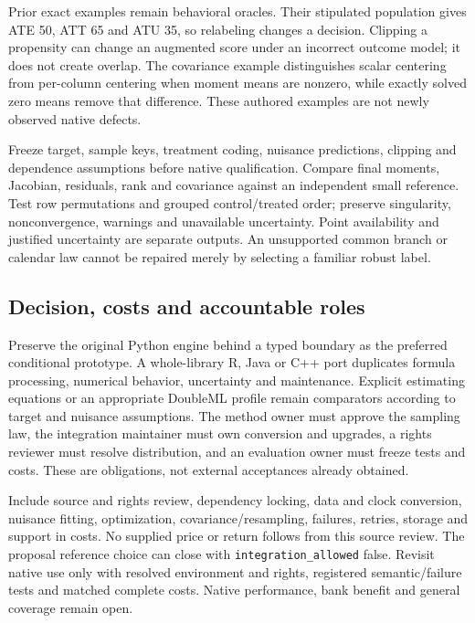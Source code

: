 Prior exact examples remain behavioral oracles. Their stipulated population gives ATE 50, ATT 65 and ATU 35, so relabeling changes a decision. Clipping a propensity can change an augmented score under an incorrect outcome model; it does not create overlap. The covariance example distinguishes scalar centering from per-column centering when moment means are nonzero, while exactly solved zero means remove that difference. These authored examples are not newly observed native defects.~\citep{exec20_python_effect_reference}

Freeze target, sample keys, treatment coding, nuisance predictions, clipping and dependence assumptions before native qualification. Compare final moments, Jacobian, residuals, rank and covariance against an independent small reference. Test row permutations and grouped control/treated order; preserve singularity, nonconvergence, warnings and unavailable uncertainty. Point availability and justified uncertainty are separate outputs. An unsupported common branch or calendar law cannot be repaired merely by selecting a familiar robust label.~\citep{exec20_python_effect_source,exec20_python_effect_reference}

\subsection{Decision, costs and accountable roles}
Preserve the original Python engine behind a typed boundary as the preferred conditional prototype. A whole-library R, Java or C++ port duplicates formula processing, numerical behavior, uncertainty and maintenance. Explicit estimating equations or an appropriate DoubleML profile remain comparators according to target and nuisance assumptions. The method owner must approve the sampling law, the integration maintainer must own conversion and upgrades, a rights reviewer must resolve distribution, and an evaluation owner must freeze tests and costs. These are obligations, not external acceptances already obtained.~\citep{exec20_python_effect_source,exec24_statsmodels_distribution}

Include source and rights review, dependency locking, data and clock conversion, nuisance fitting, optimization, covariance/resampling, failures, retries, storage and support in costs. No supplied price or return follows from this source review. The proposal reference choice can close with \texttt{integration\_allowed} false. Revisit native use only with resolved environment and rights, registered semantic/failure tests and matched complete costs. Native performance, bank benefit and general coverage remain open.~\citep{exec20_python_effect_source,exec24_statsmodels_distribution}
